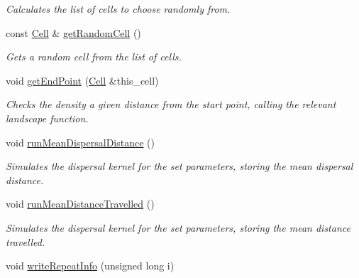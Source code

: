 \begin{DoxyCompactItemize}
\begin{DoxyCompactList}\small\item\em Calculates the list of cells to choose randomly from. \end{DoxyCompactList}\item 
const \hyperlink{struct_cell}{Cell} \& \hyperlink{class_simulate_dispersal_a7d0a2b28dd8d45f1b8a74dbcd82290e7}{get\+Random\+Cell} ()
\begin{DoxyCompactList}\small\item\em Gets a random cell from the list of cells. \end{DoxyCompactList}\item 
void \hyperlink{class_simulate_dispersal_a5069adc35fba116716bebd288dd9e65f}{get\+End\+Point} (\hyperlink{struct_cell}{Cell} \&this\+\_\+cell)
\begin{DoxyCompactList}\small\item\em Checks the density a given distance from the start point, calling the relevant landscape function. \end{DoxyCompactList}\item 
void \hyperlink{class_simulate_dispersal_a4a759f6bb3b8288345eaf7c0d66ad29e}{run\+Mean\+Dispersal\+Distance} ()\hypertarget{class_simulate_dispersal_a4a759f6bb3b8288345eaf7c0d66ad29e}{}\label{class_simulate_dispersal_a4a759f6bb3b8288345eaf7c0d66ad29e}

\begin{DoxyCompactList}\small\item\em Simulates the dispersal kernel for the set parameters, storing the mean dispersal distance. \end{DoxyCompactList}\item 
void \hyperlink{class_simulate_dispersal_a406514e917874907cfb7a8d6c7889098}{run\+Mean\+Distance\+Travelled} ()\hypertarget{class_simulate_dispersal_a406514e917874907cfb7a8d6c7889098}{}\label{class_simulate_dispersal_a406514e917874907cfb7a8d6c7889098}

\begin{DoxyCompactList}\small\item\em Simulates the dispersal kernel for the set parameters, storing the mean distance travelled. \end{DoxyCompactList}\item 
void \hyperlink{class_simulate_dispersal_ab8c48b2398f715d4de2b35a91daaae58}{write\+Repeat\+Info} (unsigned long i)\hypertarget{class_simulate_dispersal_ab8c48b2398f715d4de2b35a91daaae58}{}\label{class_simulate_dispersal_ab8c48b2398f715d4de2b35a91daaae58}


\end{DoxyCompactItemize}
